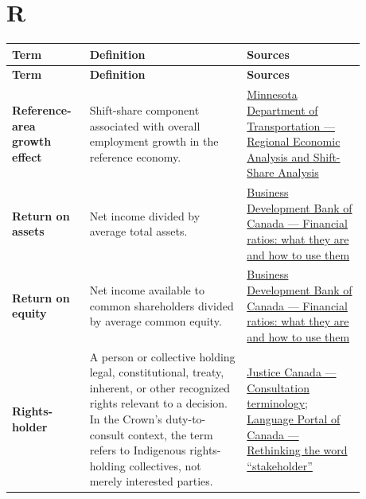\documentclass[11pt,letterpaper,oneside,openany]{book}
\begin{document}
\section[R]{R}
\begin{center}
\small
\setlength{\LTpre}{0.4em}
\setlength{\LTpost}{0.8em}
\begin{longtable}{>{\RaggedRight\arraybackslash}p{0.180\linewidth}>{\RaggedRight\arraybackslash}p{0.400\linewidth}>{\RaggedRight\arraybackslash}p{0.300\linewidth}}
\rowcolor{DeepNavy}
\color{white}\bfseries Term & \color{white}\bfseries Definition & \color{white}\bfseries Sources \\
\endfirsthead
\rowcolor{DeepNavy}
\color{white}\bfseries Term & \color{white}\bfseries Definition & \color{white}\bfseries Sources \\
\endhead
\textbf{Reference-area growth effect} & Shift-share component associated with overall employment growth in the reference economy. & \href{https://www.dot.mn.gov/ofrw/freight/PDF/d1plan/wp2.pdf}{Minnesota Department of Transportation --- Regional Economic Analysis and Shift-Share Analysis} \\
\textbf{Return on assets} & Net income divided by average total assets. & \href{https://www.bdc.ca/en/articles-tools/money-finance/manage-finances/financial-ratios-what-are-how-use}{Business Development Bank of Canada --- Financial ratios: what they are and how to use them} \\
\textbf{Return on equity} & Net income available to common shareholders divided by average common equity. & \href{https://www.bdc.ca/en/articles-tools/money-finance/manage-finances/financial-ratios-what-are-how-use}{Business Development Bank of Canada --- Financial ratios: what they are and how to use them} \\
\textbf{Rights-holder} & A person or collective holding legal, constitutional, treaty, inherent, or other recognized rights relevant to a decision. In the Crown's duty-to-consult context, the term refers to Indigenous rights-holding collectives, not merely interested parties. & \href{https://justice.canada.ca/eng/cons/def.html}{Justice Canada --- Consultation terminology}; \href{https://our-languages.canada.ca/en/blogue-blog/rethinking-the-word-stakeholder-eng}{Language Portal of Canada --- Rethinking the word ``stakeholder''} \\
\end{longtable}
\end{center}
\end{document}

